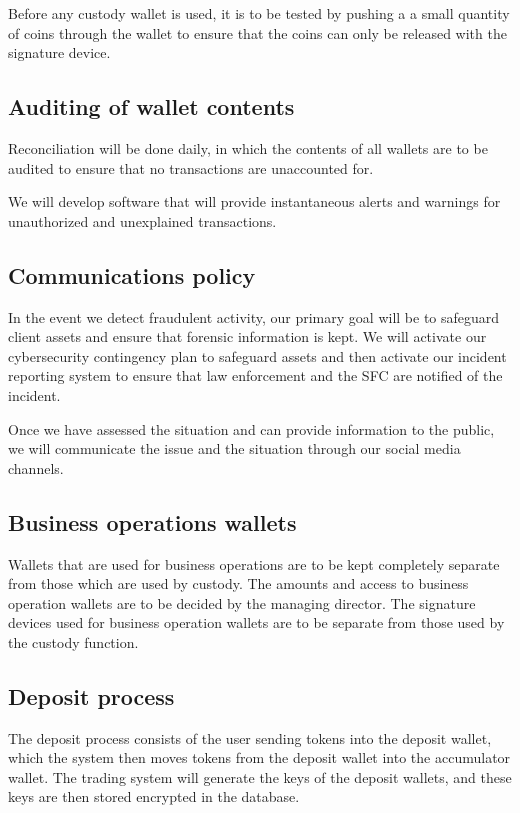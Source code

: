 Before any custody wallet is used, it is to be tested by pushing a
a small quantity of coins through the wallet to ensure that the coins can
only be released with the signature device.

\subsection{Auditing of wallet contents}

Reconciliation will be done daily, in which the contents of
all wallets are to be audited to ensure that no transactions are
unaccounted for.

We will develop software that will provide instantaneous alerts and
warnings for unauthorized and unexplained transactions.

\subsection{Communications policy}
In the event we detect fraudulent activity, our primary goal will be to
safeguard client assets and ensure that forensic information is kept.
We will activate our cybersecurity contingency plan to safeguard
assets and then activate our incident reporting system to ensure that
law enforcement and the SFC are notified of the incident.

Once we have assessed the situation and can provide
information to the public, we will communicate the issue and the
situation through our social media channels.

\subsection{Business operations wallets}

Wallets that are used for business operations are to be kept
completely separate from those which are used by custody.  The amounts
and access to business operation wallets are to be decided by the
managing director.  The signature devices used for business operation
wallets are to be separate from those used by the custody function.

\subsection{Deposit process}
The deposit process consists of the user sending tokens into the
deposit wallet, which the system then moves tokens from the deposit
wallet into the accumulator wallet.  The trading system will generate
the keys of the deposit wallets, and these keys are then stored encrypted
in the database.

